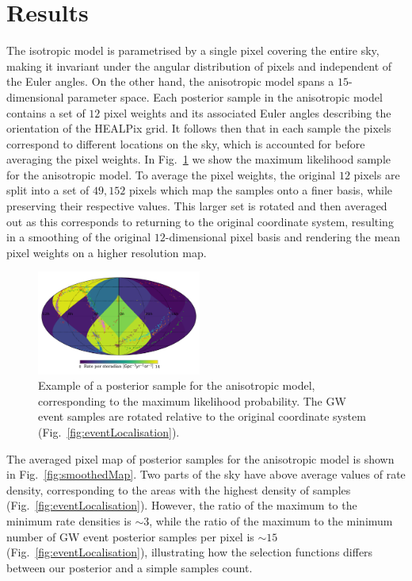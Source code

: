 \documentclass[usenatbib,useAMS]{mnras}
\begin{document}
\section{Results}\label{sec:results}

The isotropic model is parametrised by a single pixel covering the
entire sky, making it invariant under the angular distribution of pixels and
independent of the Euler angles.
On the other hand, the anisotropic model spans a $15$-dimensional parameter space.
Each posterior sample in the anisotropic model contains a set of $12$ pixel
weights and its associated Euler angles describing the orientation of the HEALPix grid.
It follows then that in each sample the pixels correspond to different locations on
the sky, which is accounted for before averaging the pixel weights.
In Fig.~\ref{fig:post_example} we show the maximum likelihood sample
for the anisotropic model. To average the pixel weights,
the original $12$ pixels are split into a set of $49,152$ pixels which map the
samples onto a finer basis, while preserving their respective values. This
larger set is rotated and then averaged out as this corresponds to returning to
the original coordinate system, resulting in  a smoothing of the original
$12$-dimensional pixel basis and rendering the mean pixel weights on a
higher resolution map.

\begin{figure}
  \centering
	\includegraphics[width=0.48\textwidth]{./figures/max_likelihood.pdf}
    \caption{Example of a posterior sample for the anisotropic model, corresponding to
    the maximum likelihood probability. The GW event samples are rotated
    relative to the original coordinate system (Fig.~\ref{fig:eventLocalisation}).}
	\label{fig:post_example}
\end{figure}

The averaged pixel map of posterior samples for the anisotropic model is shown
in Fig.~\ref{fig:smoothedMap}. Two parts of the sky have above average values of
rate density, corresponding to the areas with the highest density of samples
(Fig.~\ref{fig:eventLocalisation}). However, the ratio of the maximum to the
minimum rate densities is $\sim{3}$, while the ratio of the maximum to the minimum
number of GW event posterior samples per pixel is $\sim{15}$
(Fig.~\ref{fig:eventLocalisation}), illustrating how the selection functions
differs between our posterior and a simple samples count.
\end{document}
